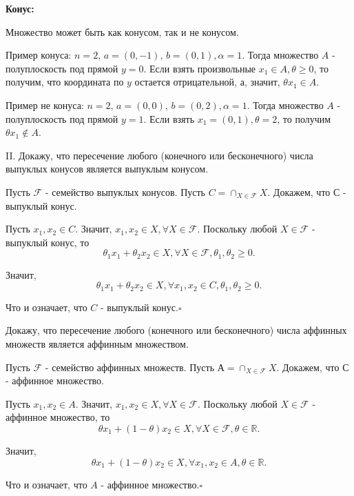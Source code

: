 \documentclass[12pt]{article}
\begin{document}
\textbf{Конус:}

Множество может быть как конусом, так и не конусом.

Пример конуса: $n=2,\,a=(0,-1), \,b = (0,1), \alpha=1$. Тогда множество $A$ - полуплоскость под прямой $y=0$. Если взять произвольные $x_1 \in A, \theta\geq 0$, то получим, что координата по $y$ остается отрицательной, а, значит, $\theta x_1 \in A$.

Пример не конуса: $n=2,\,a=(0,0), \,b = (0,2), \alpha=1$. Тогда множество $A$ - полуплоскость под прямой $y=1$. Если взять $x_1=(0,1),\theta=2$, то получим $\theta x_1\notin A$.

II. Докажу, что пересечение любого (конечного или бесконечного) числа выпуклых конусов является выпуклым конусом.

Пусть $\mathcal{F}$ - семейство выпуклых конусов. Пусть $C = \cap_{X\in\mathcal{F}}X$. Докажем, что $С$ - выпуклый конус.

Пусть $x_1,x_2\in C$. Значит, $x_1,x_2\in X,\forall X\in \mathcal{F}$. Поскольку любой $X\in \mathcal{F}$ - выпуклый конус, то $$\theta_1 x_1+\theta_2 x_2\in X,\forall X\in \mathcal{F}, \theta_1,\theta_2\geq 0.$$

Значит, $$\theta_1 x_1+\theta_2 x_2\in X,\forall x_1,x_2\in C, \theta_1,\theta_2\geq 0.$$

Что и означает, что $C$ - выпуклый конус.$\square$

Докажу, что пересечение любого (конечного или бесконечного) числа аффинных множеств является аффинным множеством.

Пусть $\mathcal{F}$ - семейство аффинных множеств. Пусть $А = \cap_{X\in\mathcal{F}}X$. Докажем, что $С$ - аффинное множество.

Пусть $x_1,x_2\in A$. Значит, $x_1,x_2\in X,\forall X\in \mathcal{F}$. Поскольку любой $X\in \mathcal{F}$ - аффинное множество, то $$\theta x_1+(1-\theta) x_2\in X,\forall X\in \mathcal{F}, \theta \in \mathbb{R}.$$

Значит, $$\theta x_1+(1-\theta) x_2\in X,\forall x_1,x_2\in A, \theta \in \mathbb{R}.$$

Что и означает, что $A$ - аффинное множество.$\square$
\end{document}
